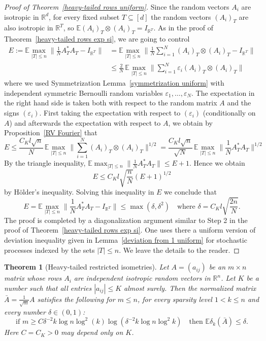 \documentclass[10pt, openany]{book}
\newtheorem{theorem}{Theorem}[chapter]
\theoremstyle{remark}
\def \R {\mathbb{R}}
\def \E {\mathbb{E}}
\def \e {\varepsilon}
\def \d {\delta}
\begin{document}
\begin{proof}[Proof of Theorem~\ref{heavy-tailed rows uniform}]
Since the random vectors $A_i$ are isotropic in $\R^d$,
for every fixed subset $T \subseteq [d]$ the random vectors $(A_i)_T$ are
also isotropic in $\R^T$, so $\E (A_i)_T \otimes (A_i)_T = I_{\R^T}$.
As in the proof of Theorem~\ref{heavy-tailed rows exp si}, we are going to control
\begin{align*}
E 
:= \E \max_{|T| \le n} \big\| \frac{1}{N} A_T^* A_T - I_{\R^T} \big\| 
&= \E \max_{|T| \le n} \Big\| \frac{1}{N} \sum_{i=1}^N (A_i)_T \otimes (A_i)_T - I_{\R^T} \Big\| \\
&\le  \frac{2}{N} \, \E \max_{|T| \le n} \Big\| \sum_{i=1}^N \e_i (A_i)_T \otimes (A_i)_T \Big\|
\end{align*}
where we used Symmetrization Lemma~\ref{symmetrization uniform}
with independent symmetric Bernoulli random variables $\e_1,\ldots, \e_N$.
The expectation in the right hand side is taken both with respect 
to the random matrix $A$ and the signs $(\e_i)$. 
First taking the expectation with respect to $(\e_i)$
(conditionally on $A$) and afterwards the expectation with respect to $A$,
we obtain by Proposition~\ref{RV Fourier} that
$$
E \le \frac{C_K l \sqrt{n}}{N} \, 
  \E \max_{|T| \le n} \Big\| \sum_{i=1}^N (A_i)_T \otimes (A_i)_T \Big\|^{1/2}
=  \frac{C_K l \sqrt{n}}{\sqrt{N}} \, 
  \E \max_{|T| \le n} \big\| \frac{1}{N} A_T^* A_T \big\|^{1/2}
$$
By the triangle inequality,
$\E \max_{|T| \le n} \big\| \frac{1}{N} A_T^* A_T \big\| \le E + 1$.
Hence we obtain
$$
E \le C_K l \sqrt{\frac{n}{N}} (E+1)^{1/2}
$$
by H\"older's inequality.
Solving this inequality in $E$ we conclude that 
\begin{equation}										\label{A*A heavy-tailed exp}
E = \E \max_{|T| \le n} \big\| \frac{1}{N} A_T^* A_T - I_{\R^T} \big\|
\le \max(\d, \d^2)
\quad \text{where } \d = C_K l \sqrt{\frac{2n}{N}}.
\end{equation}
The proof is completed by a diagonalization argument similar to Step 2 in the 
proof of Theorem~\ref{heavy-tailed rows exp si}. One uses there a uniform version of 
deviation inequality given in Lemma~\ref{deviation from 1 uniform} for stochastic 
processes indexed by the sets $|T| \le n$. We leave the details to the reader. 
\end{proof}


\begin{theorem}[Heavy-tailed restricted isometries]					\label{heavy-tailed RIP}
  Let $A=(a_{ij})$ be an $m \times n$ matrix whose rows $A_i$ are independent
  isotropic random vectors in $\R^n$. Let $K$ be a number such that
  all entries $|a_{ij}| \le K$ almost surely.
  Then the normalized matrix $\bar{A} = \frac{1}{\sqrt{m}} A$ satisfies the following for $m \le n$, for every 
  sparsity level $1 < k \le n$ and every number $\d \in (0,1)$:
  \begin{equation}							\label{eq heavy-tailed RIP}
  \text{if } m \ge C \d^{-2} k \log n \log^2(k) \log(\d^{-2} k \log n \log^2 k)
  \quad \text{then } \E \d_k(\bar{A}) \le \d.
  \end{equation}
  Here $C = C_K > 0$ may depend only on $K$.  
\end{theorem}
\end{document}
